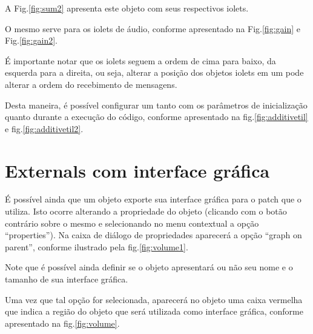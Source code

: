 
A Fig.\ref{fig:sum2} apresenta este objeto com seus respectivos iolets.


O mesmo serve para os iolets de áudio, conforme apresentado na
Fig.\ref{fig:gain} e Fig.\ref{fig:gain2}.


É importante notar que os iolets seguem a ordem de cima para baixo, da esquerda
para a direita, ou seja, alterar a posição dos objetos iolets em um \external
pode alterar a ordem do recebimento de mensagens.


Desta maneira, é possível configurar um \external tanto com os parâmetros de
inicialização quanto durante a execução do código, conforme apresentado na
fig.\ref{fig:additivetil} e fig.\ref{fig:additivetil2}.



\section{Externals com interface gráfica}

É possível ainda que um objeto exporte sua interface gráfica para o patch que
o utiliza.
Isto ocorre alterando a propriedade do objeto (clicando com o botão contrário
sobre o mesmo e selecionando no menu contextual a opção ``properties'').
Na caixa de diálogo de propriedades aparecerá a opção ``graph on parent'',
conforme ilustrado pela fig.\ref{fig:volume1}.


Note que é possível ainda definir se o objeto apresentará ou não seu nome e o
tamanho de sua interface gráfica.

Uma vez que tal opção for selecionada, aparecerá no objeto uma caixa vermelha
que indica a região do objeto que será utilizada como interface gráfica,
conforme apresentado na fig.\ref{fig:volume}.


